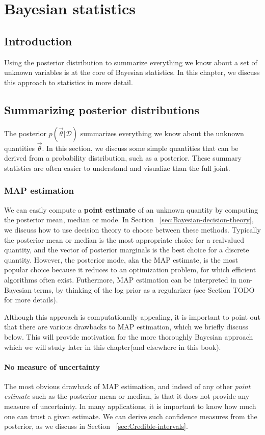\chapter{Bayesian statistics}


\section{Introduction}
Using the posterior distribution to summarize everything we know about a set of unknown variables is at the core of Bayesian statistics. In this chapter, we discuss this approach to statistics in more detail.


\section{Summarizing posterior distributions}
The posterior $p(\vec{\theta}|\mathcal{D})$ summarizes everything we know about the unknown quantities $\vec{\theta}$. In this section, we discuss some simple quantities that can be derived from a probability distribution, such as a posterior. These summary statistics are often easier to understand and visualize than the full joint.


\subsection{MAP estimation}
We can easily compute a \textbf{point estimate} of an unknown quantity by computing the posterior mean, median or mode. In Section ~\ref{sec:Bayesian-decision-theory}, we discuss how to use decision theory to choose between these methods. Typically the posterior mean or median is the most appropriate choice for a realvalued quantity, and the vector of posterior marginals is the best choice for a discrete quantity. However, the posterior mode, aka the MAP estimate, is the most popular choice because it reduces to an optimization problem, for which efficient algorithms often exist. Futhermore, MAP estimation can be interpreted in non-Bayesian terms, by thinking of the log prior as a regularizer (see Section TODO for more details).

Although this approach is computationally appealing, it is important to point out that there are various drawbacks to MAP estimation, which we briefly discuss below. This will provide motivation for the more thoroughly Bayesian approach which we will study later in this chapter(and elsewhere in this book).


\subsubsection{No measure of uncertainty}
The most obvious drawback of MAP estimation, and indeed of any other \emph{point estimate} such as the posterior mean or median, is that it does not provide any measure of uncertainty. In many applications, it is important to know how much one can trust a given estimate. We can derive such confidence measures from the posterior, as we discuss in Section ~\ref{sec:Credible-intervals}.

